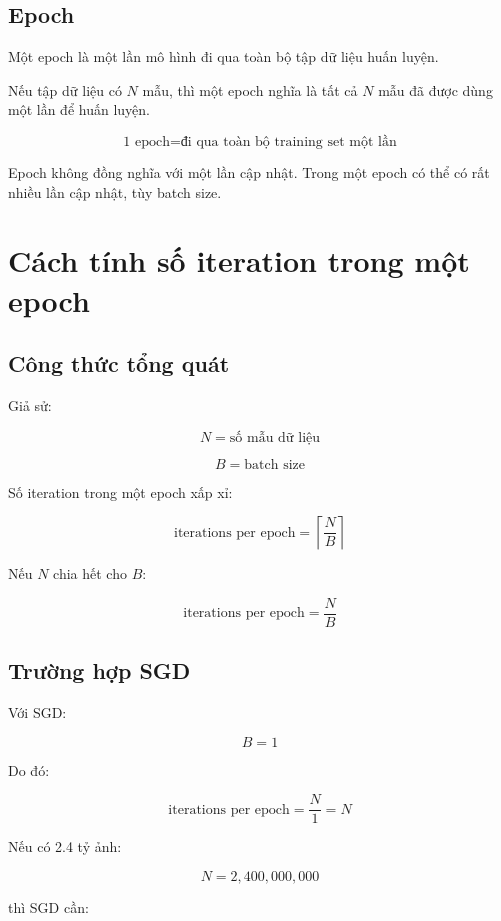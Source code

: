 \documentclass[12pt,a4paper]{report}
\begin{document}
\section{Epoch}

Một epoch là một lần mô hình đi qua toàn bộ tập dữ liệu huấn luyện.

Nếu tập dữ liệu có $N$ mẫu, thì một epoch nghĩa là tất cả $N$ mẫu đã được dùng một lần để huấn luyện.

\[
    \text{1 epoch}
    =
    \text{đi qua toàn bộ training set một lần}
\]

\begin{ghinho}
Epoch không đồng nghĩa với một lần cập nhật. Trong một epoch có thể có rất nhiều lần cập nhật, tùy batch size.
\end{ghinho}

\chapter{Cách tính số iteration trong một epoch}

\section{Công thức tổng quát}

Giả sử:

\[
    N = \text{số mẫu dữ liệu}
\]

\[
    B = \text{batch size}
\]

Số iteration trong một epoch xấp xỉ:

\[
    \text{iterations per epoch}
    =
    \left\lceil
    \frac{N}{B}
    \right\rceil
\]

Nếu $N$ chia hết cho $B$:

\[
    \text{iterations per epoch}
    =
    \frac{N}{B}
\]

\section{Trường hợp SGD}

Với SGD:

\[
    B=1
\]

Do đó:

\[
    \text{iterations per epoch}
    =
    \frac{N}{1}
    =
    N
\]

Nếu có 2.4 tỷ ảnh:

\[
    N=2,400,000,000
\]

thì SGD cần:
\end{document}
